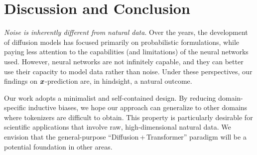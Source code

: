 \section{Discussion and Conclusion}

\textit{Noise is inherently different from natural data}. Over the years, the development of diffusion models has focused primarily on probabilistic formulations, while paying less attention to the capabilities (and limitations) of the neural networks used. However, neural networks are not infinitely capable, and they can better use their capacity to model data rather than noise. Under these perspectives, our findings on $\bm{x}$-prediction are, in hindsight, a natural outcome.

Our work adopts a minimalist and self-contained design. By reducing domain-specific inductive biases, we hope our approach can generalize to other domains where tokenizers are difficult to obtain.
This property is particularly desirable for scientific applications that involve raw, high-dimensional natural data.
We envision that the general-purpose ``Diffusion\,+\,Transformer'' paradigm will be a potential foundation in other areas.

\newpage